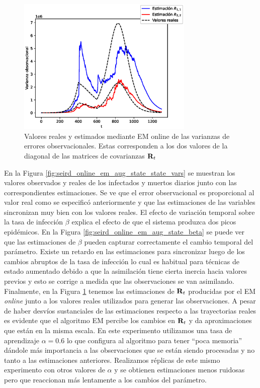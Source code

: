 \begin{figure}[h]
    \centering
    \includegraphics[width=0.75\textwidth]{figs/seird_online_em_aug_state_R.eps}
    \caption{Valores reales y estimados mediante EM online de las varianzas de errores observacionales. Estas corresponden a los dos valores de la diagonal de las matrices de covarianzas $\mathbf{R}_t$}
    \label{fig:seird_online_em_aug_state_R}
\end{figure}

En la Figura \ref{fig:seird_online_em_aug_state_state_vars} se muestran los valores observados y reales de los infectados y muertos diarios junto con las correspondientes estimaciones. Se ve que el error observacional es proporcional al valor real como se especificó anteriormente y que las estimaciones de las variables sincronizan muy bien con los valores reales. El efecto de variación temporal sobre la tasa de infección $\beta$ explica el efecto de que el sistema produzca dos picos epidémicos. En la Figura \ref{fig:seird_online_em_aug_state_beta} se puede ver que las estimaciones de $\beta$ pueden capturar correctamente el cambio temporal del parámetro. Existe un retardo en las estimaciones para sincronizar luego de los cambios abruptos de la tasa de infección lo cual es habitual para técnicas de estado aumentado debido a que la asimilación tiene cierta inercia hacia valores previos y esto se corrige a medida que las observaciones se van asimilando. Finalmente, en la Figura \ref{fig:seird_online_em_aug_state_R} tenemos las estimaciones de $\mathbf{R}_t$ producidas por el EM \textit{online} junto a los valores reales utilizados para generar las observaciones. A pesar de haber desvíos sustanciales de las estimaciones respecto a las trayectorias reales es evidente que el algoritmo EM percibe los cambios en $\mathbf{R}_t$ y da aproximaciones que están en la misma escala. En este experimento utilizamos una tasa de aprendizaje $\alpha = 0.6$ lo que configura al algoritmo para tener ``poca memoria'' dándole más importancia a las observaciones que se están siendo procesadas y no tanto a las estimaciones anteriores. Realizamos réplicas de este mismo experimento con otros valores de $\alpha$ y se obtienen estimaciones menos ruidosas pero que reaccionan más lentamente a los cambios del parámetro.

